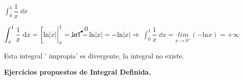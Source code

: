 \begin{ejre}
	$\displaystyle \int_0^1 \dfrac 1 x \; \dd x$
\end{ejre}
\begin{proofw}\renewcommand{\qedsymbol}{$\diamond$}	
	
	$\displaystyle \int_x^1 \dfrac 1 x \; \dd x= \eval[\mathrm{ln}\abs {x}|_x^1=  \cancelto{0}{\mathrm{ln} 1}- \mathrm{ln} |x|=-\mathrm{ln} |x| \Rightarrow $
	$\displaystyle \int_0^1 \dfrac 1 x \; \dd x= \underset {x\to 0^+}{lim }{(-\mathrm{ln} x)} =+\infty $
	
	Esta integral ' impropia' es divergente, la integral no existe.
\end{proofw}

\textbf{Ejercicios propuestos de Integral Definida.}

